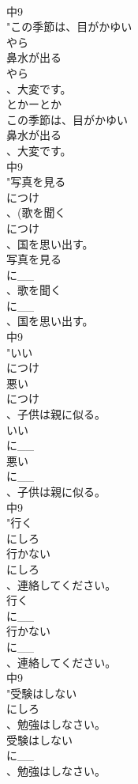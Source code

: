 \documentclass[8pt]{extreport}
\begin{document}
\begin{CJK}{UTF8}{min}
\\	中9
\\	"この季節は、目がかゆい
\\	やら
\\	鼻水が出る
\\	やら
\\	、大変です。
\\	とかーとか 
\\	この季節は、目がかゆい
\\	鼻水が出る
\\	、大変です。
\\	中9
\\	"写真を見る
\\	につけ
\\	、(歌を聞く
\\	につけ
\\	、国を思い出す。
\\	写真を見る
\\	に__
\\	、歌を聞く
\\	に__
\\	、国を思い出す。
\\	中9
\\	"いい
\\	につけ
\\	悪い
\\	につけ
\\	、子供は親に似る。
\\	いい
\\	に__
\\	悪い
\\	に__
\\	、子供は親に似る。
\\	中9
\\	"行く
\\	にしろ
\\	行かない
\\	にしろ
\\	、連絡してください。
\\	行く
\\	に__
\\	行かない
\\	に__
\\	、連絡してください。
\\	中9
\\	"受験はしない
\\	にしろ
\\	、勉強はしなさい。
\\	受験はしない
\\	に__
\\	、勉強はしなさい。

\end{CJK}
\end{document}
